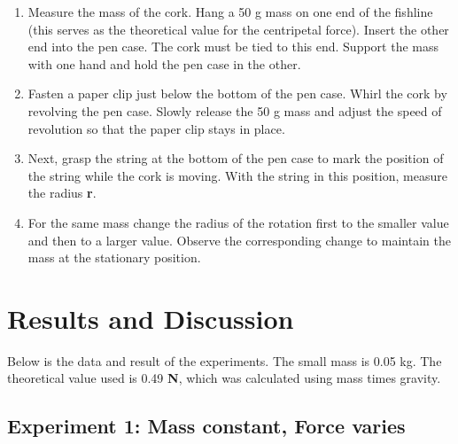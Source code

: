 \documentclass[a4paper,12pt]{article}
\begin{document}
\begin{enumerate}
    \item Measure the mass of the cork. Hang a 50 g mass on one end of the fishline (this serves as the theoretical value for the centripetal force). Insert the other end into the pen case. The cork must be tied to this end. Support the mass with one hand and hold the pen case in the other.
    \item Fasten a paper clip just below the bottom of the pen case. Whirl the cork by revolving the pen case. Slowly release the 50 g mass and adjust the speed of revolution so that the paper clip stays in place.
    \item Next, grasp the string at the bottom of the pen case to mark the position of the string while the cork is moving. With the string in this position, measure the radius \textbf{r}.
    \item For the same mass change the radius of the rotation first to the smaller value and then to a larger value. Observe the corresponding change to maintain the mass at the stationary position.
\end{enumerate}


\section{Results and Discussion}
Below is the data and result of the experiments. The small mass is 0.05 kg. The theoretical value used is 0.49 \textbf{N}, which was calculated using mass times gravity.

\subsection{Experiment 1: Mass constant, Force varies}
\begin{table}[h]
    \centering
    \renewcommand{\arraystretch}{1.2}
    \caption{Results of the Experiment}
    \label{table:exp}
\end{table}
\end{document}
